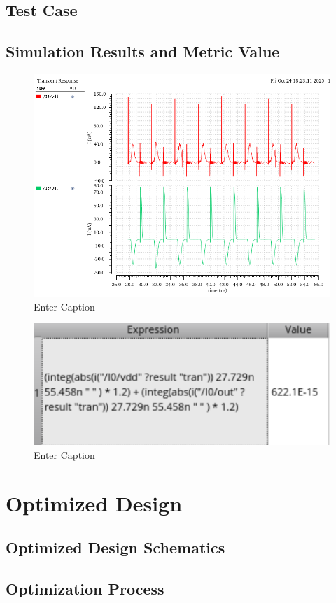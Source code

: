 \documentclass[12pt]{article}
\begin{document}
\newpage

\subsection{Test Case}



\newpage

\subsection{Simulation Results and Metric Value}
\begin{figure}[H]
    \centering
    \includegraphics[width=0.5\linewidth]{writeup//figures/baseline_energy_currents.png}
    \caption{Enter Caption}
\end{figure}

\begin{figure}[H]
    \centering
    \includegraphics[width=0.5\linewidth]{writeup//figures/baseline_energy_val.png}
    \caption{Enter Caption}
\end{figure}

\newpage

\section{Optimized Design}
\subsection{Optimized Design Schematics}



\newpage

\subsection{Optimization Process}
\end{document}
